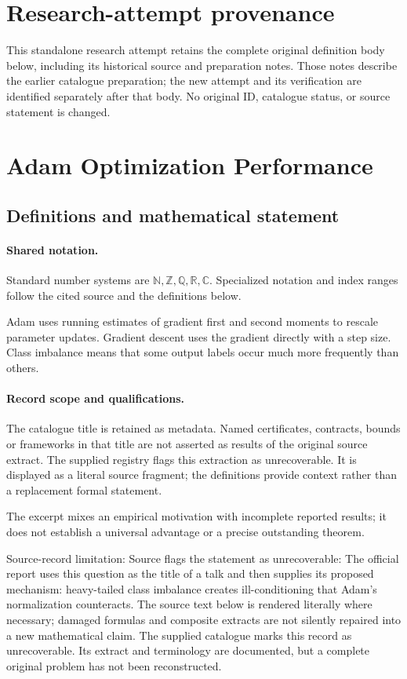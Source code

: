 \documentclass[11pt]{article}
\begin{document}
\section*{Research-attempt provenance}
This standalone research attempt retains the complete original definition body below,
including its historical source and preparation notes. Those notes describe the
earlier catalogue preparation; the new attempt and its verification are identified
separately after that body. No original ID, catalogue status, or source statement is changed.

\section{Adam Optimization Performance}\label{statement}

\subsection{Definitions and mathematical statement}

\paragraph{Shared notation.}Standard number systems are $\mathbb N,\mathbb Z,\mathbb Q,\mathbb R,\mathbb C$. Specialized notation and index ranges follow the cited source and the definitions below.


Adam uses running estimates of gradient first and second moments to rescale parameter updates. Gradient descent uses the gradient directly with a step size. Class imbalance means that some output labels occur much more frequently than others.
\paragraph{Record scope and qualifications.}
The catalogue title is retained as metadata. Named certificates, contracts, bounds or frameworks in that title are not asserted as results of the original source extract.
The supplied registry flags this extraction as unrecoverable. It is displayed as a literal source fragment; the definitions provide context rather than a replacement formal statement.

The excerpt mixes an empirical motivation with incomplete reported results; it does not establish a universal advantage or a precise outstanding theorem.

Source-record limitation: Source flags the statement as unrecoverable: The official report uses this question as the title of a talk and then supplies its proposed mechanism: heavy-tailed class imbalance creates ill-conditioning that Adam’s normalization counteracts.
The source text below is rendered literally where necessary; damaged formulas and composite extracts are not silently repaired into a new mathematical claim.
The supplied catalogue marks this record as unrecoverable. Its extract and terminology are documented, but a complete original problem has not been reconstructed.
\end{document}
